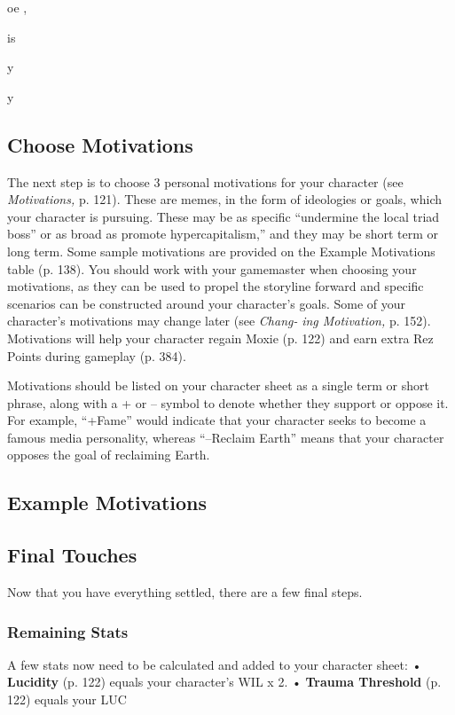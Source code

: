 oe ,

is

y 

y

\subsection{Choose Motivations}

The next step is to choose 3 personal motivations 
for your character (see \textit{Motivations,} p. 121). These 
are memes, in the form of ideologies or goals, which 
your character is pursuing. These may be as specific 
``undermine the local triad boss'' or as broad as promote
hypercapitalism,'' and they may be short term
or long term. Some sample motivations are provided 
on the Example Motivations table (p. 138). You 
should work with your gamemaster when choosing 
your motivations, as they can be used to propel the 
storyline forward and specific scenarios can be constructed
around your character's goals. Some of your
character's motivations may change later (see \textit{Chang-}
\textit{ing Motivation,} p. 152). Motivations will help your 
character regain Moxie (p. 122) and earn extra Rez 
Points during gameplay (p. 384).

Motivations should be listed on your character 
sheet as a single term or short phrase, along with a + 
or – symbol to denote whether they support or oppose 
it. For example, ``+Fame'' would indicate that your 
character seeks to become a famous media personality, 
whereas ``–Reclaim Earth'' means that your character 
opposes the goal of reclaiming Earth.

\subsection{Example Motivations}


\subsection{Final Touches}

Now that you have everything settled, there are a few 
final steps.

\subsubsection{Remaining Stats}

A few stats now need to be calculated and added to 
your character sheet:
•  \textbf{Lucidity} (p. 122) equals your character's WIL x 2.
•  \textbf{Trauma Threshold} (p. 122) equals your LUC 

